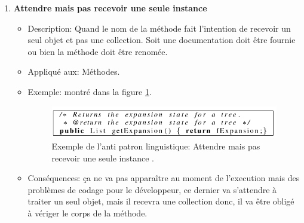 \begin{enumerate}
\item \textbf{Attendre mais pas recevoir une seule instance}
\begin{itemize}
\item Description: Quand le nom de la méthode fait l’intention de recevoir un seul objet et pas une collection.
Soit une documentation doit être fournie ou bien la méthode doit être renomée.
\item Appliqué aux: Méthodes.
\item Exemple: montré dans la figure \ref{fig:un_quatre}.
\begin{figure}[H]
	\centering
\includegraphics[width=0.9\linewidth]{Others/Resources/un_quatre.png}
	\caption{Exemple de l'anti patron linguistique: Attendre mais pas recevoir une seule instance \cite{arnaoudova2013new}.}
		\label{fig:un_quatre}
	\end{figure}
\item Conséquences: ça ne va pas apparaître au moment de l’execution mais des problèmes de codage pour le développeur, ce dernier va s’attendre à traiter un seul objet, mais il recevra une collection donc, il va être obligé à vériger le corps de la méthode.

\end{itemize}

\end{enumerate}
